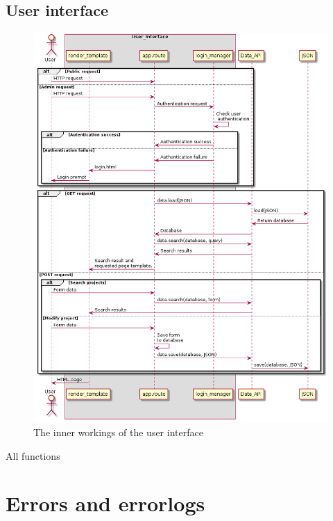 \documentclass{TDP003mall}
\begin{document}
\subsection{User interface}
\begin{figure}[h!]
    \centering
    \includegraphics[width=\linewidth]{sekvensdiagram2-3.png}
    \caption{The inner workings of the user interface}
    \label{sekvensdiagram2}
\end{figure}
All functions
\section{Errors and errorlogs}
\end{document}
